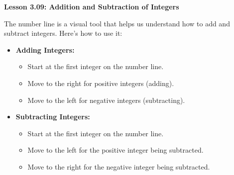 \begin{center}
\textbf{Lesson 3.09: Addition and Subtraction of Integers}
\end{center}

\vspace*{-1.5ex}


\noindent The number line is a visual tool that helps us understand how to add and subtract integers. Here’s how to use it:

\begin{itemize}
    \item \textbf{Adding Integers:}
    \begin{itemize}
        \item Start at the first integer on the number line.
        \item Move to the right for positive integers (adding).
        \item Move to the left for negative integers (subtracting).
    \end{itemize}
    
    \item \textbf{Subtracting Integers:}
    \begin{itemize}
        \item Start at the first integer on the number line.
        \item Move to the left for the positive integer being subtracted.
        \item Move to the right for the negative integer being subtracted.
    \end{itemize}
\end{itemize}



